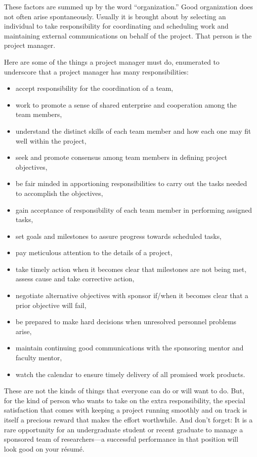 \documentclass[12pt]{article}
\begin{document}
These factors are summed up by the word ``organization.'' Good organization does
not often arise spontaneously. Usually it is brought about by selecting an
individual to take responsibility for coordinating and scheduling work and
maintaining external communications on behalf of the project. That person is
the project manager.


Here are some of the things a project manager must do, enumerated to underscore that a project manager has many responsibilities:
\begin{itemize}
    \item accept responsibility for the coordination of a team,
    \item work to promote a sense of shared enterprise and cooperation among the team members,
    \item understand the distinct skills of each team member and how each one may fit well within the project,
    \item seek and promote consensus among team members in defining project objectives,
    \item be fair minded in apportioning responsibilities to carry out the tasks needed to accomplish the objectives,
    \item gain acceptance of responsibility of each team member in performing assigned tasks,
    \item set goals and milestones to assure progress towards scheduled tasks,
    \item pay meticulous attention to the details of a project,
    \item take timely action when it becomes clear that milestones are not being met, assess cause and take corrective action,
    \item negotiate alternative objectives with sponsor if/when it becomes clear that a prior objective will fail,
    \item be prepared to make hard decisions when unresolved personnel problems arise,
    \item maintain continuing good communications with the sponsoring mentor and faculty mentor,
    \item watch the calendar to ensure timely delivery of all promised work products.
\end{itemize}


These are not the kinds of things that everyone can do or will want to do.
But, for the kind of person who wants to take on the extra responsibility, the
special satisfaction that comes with keeping a project running smoothly and on
track is itself a precious reward that makes the effort worthwhile. And don’t
forget: It is a rare opportunity for an undergraduate student or recent
graduate to manage a sponsored team of researchers—a successful performance in
that position will look good on your résumé.




\nocite{*}

\end{document}
